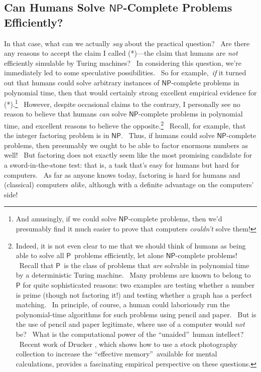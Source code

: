 \documentclass[12pt,onecolumn]{article}%
\begin{document}
\subsection{Can Humans Solve $\mathsf{NP}$-Complete Problems
Efficiently?\label{HUMANS}}

In that case, what can we actually \textit{say} about the practical question?
\ Are there any reasons to accept the claim I called (*)---the claim that
humans are \textit{not} efficiently simulable by Turing machines? \ In
considering this question, we're immediately led to some speculative
possibilities. \ So for example,\ \textit{if} it turned out that humans could
solve arbitrary instances of $\mathsf{NP}$-complete problems in polynomial
time, then that would certainly strong excellent empirical evidence for
(*).\footnote{And amusingly, if we could solve $\mathsf{NP}$-complete
problems, then we'd presumably find it much easier to prove that computers
\textit{couldn't} solve them!} \ However, despite occasional claims to the
contrary, I personally see no reason to believe that humans \textit{can} solve
$\mathsf{NP}$-complete problems in polynomial time, and excellent reasons to
believe the opposite.\footnote{Indeed, it is not even clear to me that we
should think of humans as being able to solve all $\mathsf{P}$\ problems
efficiently, let alone $\mathsf{NP}$-complete problems! \ Recall that
$\mathsf{P}$\ is the class of problems that \textit{are} solvable in
polynomial time by a deterministic Turing machine. \ Many problems are known
to belong to $\mathsf{P}$ for quite sophisticated reasons: two examples are
testing whether a number is prime (though not factoring it!) \cite{aks} and
testing whether a graph has a perfect matching. \ In principle, of course, a
human could laboriously run the polynomial-time algorithms for such problems
using pencil and paper. \ But is the use of pencil and paper legitimate, where
use of a computer would \textit{not} be? \ What is the computational power of
the \textquotedblleft unaided\textquotedblright\ human intellect? \ Recent
work of Drucker \cite{drucker}, which shows how to use a stock photography
collection to increase the \textquotedblleft effective
memory\textquotedblright\ available for mental calculations, provides a
fascinating empirical perspective on these questions.} \ Recall, for example,
that the integer factoring problem is in $\mathsf{NP}$. \ Thus, if humans
could solve $\mathsf{NP}$-complete problems, then presumably we ought to be
able to factor enormous numbers as well! \ But factoring does not exactly seem
like the most promising candidate for a sword-in-the-stone test: that is, a
task that's easy for humans but hard for computers. \ As far as anyone knows
today, factoring is hard for humans and (classical) computers\textit{ alike},
although with a definite advantage on the computers' side!
\end{document}
